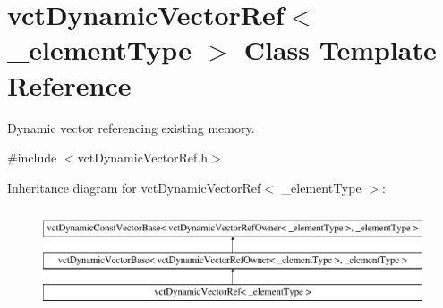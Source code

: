 \hypertarget{classvct_dynamic_vector_ref}{}\section{vct\+Dynamic\+Vector\+Ref$<$ \+\_\+element\+Type $>$ Class Template Reference}
\label{classvct_dynamic_vector_ref}


Dynamic vector referencing existing memory.  




{\ttfamily \#include $<$vct\+Dynamic\+Vector\+Ref.\+h$>$}

Inheritance diagram for vct\+Dynamic\+Vector\+Ref$<$ \+\_\+element\+Type $>$\+:\begin{figure}[H]
\begin{center}
\leavevmode
\includegraphics[height=3.000000cm]{d7/df1/classvct_dynamic_vector_ref}
\end{center}
\end{figure}
